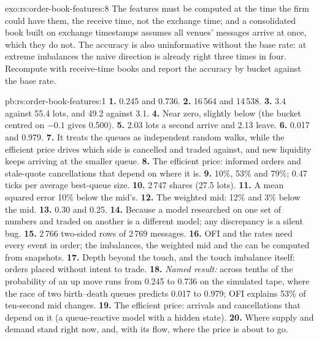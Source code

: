 \begin{solution}{exo:rs:order-book-features:8}
The features must be computed at the time the firm could have them, the receive time, not the exchange time; and a consolidated book built
on exchange timestamps assumes all venues' messages arrive at once, which they do not. The accuracy is also uninformative without the
base rate: at extreme imbalances the naive direction is already right three times in four. Recompute with receive-time books and report the
accuracy by bucket against the base rate.
\end{solution}

\begin{solution}{pb:rs:order-book-features:1}
\textbf{1.} 0.245 and 0.736. \textbf{2.} 16\,564 and 14\,538. \textbf{3.} 3.4 against 55.4 lots, and 49.2 against 3.1. \textbf{4.} Near zero,
slightly below (the bucket centred on $-0.1$ gives 0.500). \textbf{5.} 2.03 lots a second arrive and 2.13 leave. \textbf{6.} 0.017 and 0.979.
\textbf{7.} It treats the queues as independent random walks, while the efficient price drives which side is cancelled and traded against,
and new liquidity keeps arriving at the smaller queue. \textbf{8.} The efficient price: informed orders and stale-quote cancellations that
depend on where it is. \textbf{9.} 10\%, 53\% and 79\%; 0.47 ticks per average best-queue size. \textbf{10.} 2\,747 shares (27.5 lots).
\textbf{11.} A mean squared error 10\% below the mid's. \textbf{12.} The weighted mid: 12\% and 3\% below the mid. \textbf{13.} 0.30 and
0.25. \textbf{14.} Because a model researched on one set of numbers and traded on another is a different model; any discrepancy is a
silent bug. \textbf{15.} 2\,766 two-sided rows of 2\,769 messages. \textbf{16.} OFI and the rates need every event in order; the imbalances,
the weighted mid and the  can be computed from snapshots. \textbf{17.} Depth beyond the touch, and the touch imbalance itself:
orders placed without intent to trade. \textbf{18.} \emph{Named result:} across tenths of  the probability of an up move runs
from 0.245 to 0.736 on the simulated tape, where the race of two birth--death queues predicts 0.017 to 0.979; OFI explains 53\% of ten-second
mid changes. \textbf{19.} The efficient price: arrivals and cancellations that depend on it (a queue-reactive model with a hidden state).
\textbf{20.} Where supply and demand stand right now, and, with its flow, where the price is about to go.
\end{solution}

